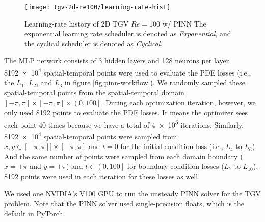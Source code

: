 \begin{figure}
    \centering%
    \texttt{[image: tgv-2d-re100/learning-rate-hist]}%
    \caption{%
        Learning-rate history of 2D TGV $Re=\num{100}$ w/ PINN
        The exponential learning rate scheduler is denoted as {\it Exponential}, and the cyclical scheduler is denoted as {\it Cyclical}.
    }
    \label{fig:tgv-learning-rate-hist}%
\end{figure}

The MLP network consists of \num{3} hidden layers and \num{128} neurons per layer.
\num{8192e4} spatial-temporal points were used to evaluate the PDE losses (i.e., the $L_1$, $L_2$, and $L_3$ in figure \ref{fig:pinn-workflow}).
We randomly sampled these spatial-temporal points from the spatial-temporal domain$\left[-\pi, \pi\right] \times \left[-\pi, \pi\right] \times \left(0, 100\right]$.
During each optimization iteration, however, we only used \num{8192} points to evaluate the PDE losses.
It means the optimizer sees each point \num{40} times because we have a total of \num{4e5} iterations.
Similarly, \num{8192e4} spatial-temporal points were sampled from $x,y \in \left[-\pi, \pi\right] ] \times \left[-\pi, \pi\right]$ and $t=0$ for the initial condition loss (i.e., $L_4$ to $L_6$).
And the same number of points were sampled from each domain boundary ($x=\pm\pi$ and $y=\pm\pi$) and $t\in\left(0, 100\right]$ for boundary-condition losses ($L_7$ to $L_{10}$).
\num{8192} points were used in each iteration for these losses as well.

We used one NVIDIA's V100 GPU to run the unsteady PINN solver for the TGV problem.
Note that the PINN solver used single-precision floats, which is the default in PyTorch.

